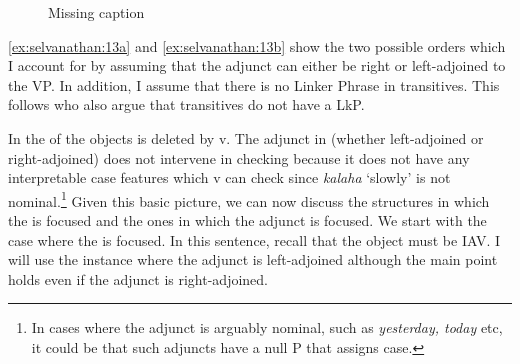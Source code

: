 \documentclass[output=paper
,newtxmath
,modfonts
,nonflat]{langsci/langscibook}
\begin{document}
\begin{figure}
%
	\caption{\label{fig:selvanathan:5}\color{red}Missing caption}
\end{figure}

   
\ref{ex:selvanathan:13a} and \ref{ex:selvanathan:13b} show the two possible orders which I account for by assuming that the  adjunct can either be right or left-adjoined to the VP. In addition, I assume that there is no Linker Phrase in transitives. This follows \citet{Baker2006} who also argue that  transitives do not have a LkP.

In  the  of the objects is deleted by v. The adjunct in  (whether left-adjoined or right-adjoined) does not intervene in  checking because it does not have any interpretable case features which v can check since \textit{kalaha} ‘slowly’ is not nominal.\footnote{In cases where the adjunct is arguably nominal, such as \textit{yesterday, today} etc, it could be that such adjuncts have a null P that assigns case.}  Given this basic picture, we can now discuss the structures in which the  is focused and the ones in which the adjunct is focused. We start with the case where the  is focused. In this sentence, recall that the object must be IAV. I will use the instance where the adjunct is left-adjoined although the main point holds even if the adjunct is right-adjoined.
\end{document}
